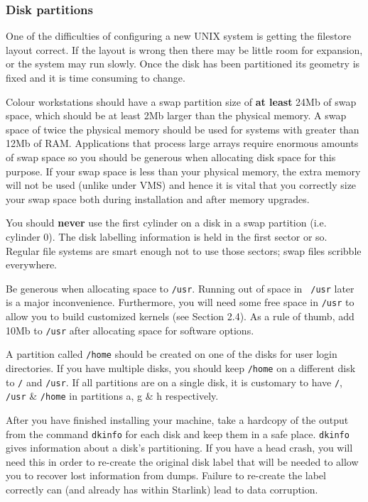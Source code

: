 \subsubsection{Disk partitions}

One of the difficulties of configuring a new UNIX system is getting the
filestore layout correct. If the layout is wrong then there may be little room
for expansion, or the system may run slowly. Once the disk has been partitioned
its geometry is fixed and it is time consuming to change.

Colour workstations should have a swap partition size of {\bf at least}
24Mb of swap
space, which should be at least 2Mb larger than the physical memory.
A swap space of twice the physical memory should be used for systems
with greater than 12Mb of RAM. Applications that process large arrays
require enormous amounts of swap space so you should be generous
when allocating disk space for this purpose.
If your
swap space is less than your physical memory, the extra memory will not
be used (unlike under VMS) and hence it is vital that you correctly size
your swap space both during installation and after memory upgrades.

You should {\bf never} use the first cylinder on a disk in a swap partition
(i.e. cylinder 0). The disk labelling information is held in the first sector
or so. Regular file systems are smart enough not to use those sectors; swap
files scribble everywhere.

Be generous when allocating space to {\tt /usr}. Running out of space in {\tt
/usr} later is a major inconvenience. Furthermore, you will need some free
space in {\tt /usr} to allow you to build customized kernels (see Section 2.4). As a
rule of thumb, add 10Mb to {\tt /usr} after allocating space for software options.

A partition called {\tt /home} should be created on one of the disks for user login
directories. If you have multiple disks, you should keep {\tt /home} on a different
disk to {\tt /} and {\tt /usr}. If all partitions are on a single disk, it is customary
to have {\tt /}, {\tt /usr} \& {\tt /home} in partitions a, g \& h  respectively.

After you have finished installing your machine, take a hardcopy of the output
from the command {\tt dkinfo} for each disk and keep them in a safe place.
{\tt dkinfo} gives information about a disk's partitioning. If you have a head crash,
you will need this in order to re-create the original disk label that will
be needed to allow you to recover lost information from dumps. Failure
to re-create the label correctly can (and already has within Starlink) lead
to data corruption.

